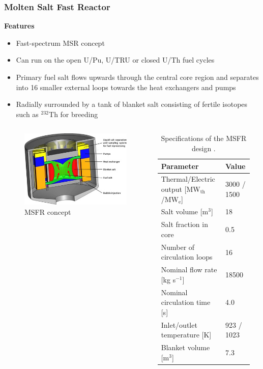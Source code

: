 \begin{frame}
	\frametitle{Molten Salt Fast Reactor}
		\textbf{Features}
		\begin{itemize}
			\item Fast-spectrum \gls{MSR} concept
			\item Can run on the open U/Pu, U/TRU or closed U/Th fuel cycles
			\item Primary fuel salt flows upwards through the central core
			region and separates into 16 smaller external loops towards the
			heat exchangers and pumps
			\item Radially surrounded by a tank of blanket salt consisting of
			fertile isotopes such as $^{232}$Th for breeding
		\end{itemize}
		\begin{columns}
			\column[t]{3.5cm}
			\begin{figure}
				\includegraphics[width=\textwidth]{../paper/figures/MSFR}
				\caption{\gls{MSFR} concept}
			\end{figure}
			\column[t]{6.5cm}
			{\footnotesize
			\begin{table}[h]
				\caption{\footnotesize Specifications of the \gls{MSFR} design
				\cite{serp_molten_2014}.}
				\begin{tabular}{ l l }
				\hline
				Parameter & Value \\
				\hline
				Thermal/Electric output [MW$_{\text{th}}$/MW$_{\text{e}}$] &
				3000 / 1500 \\
				Salt volume [m$^3$] & 18 \\
				Salt fraction in core & 0.5 \\
				Number of circulation loops & 16 \\
				Nominal flow rate [kg s$^{-1}$] & 18500  \\
				Nominal circulation time [s] & 4.0 \\
				Inlet/outlet temperature [K] & 923 / 1023 \\
				Blanket volume [m$^3$] & 7.3\\
				\hline
				\end{tabular}
			\label{table:msfr}
			\end{table}
			}
		\end{columns}
\end{frame}